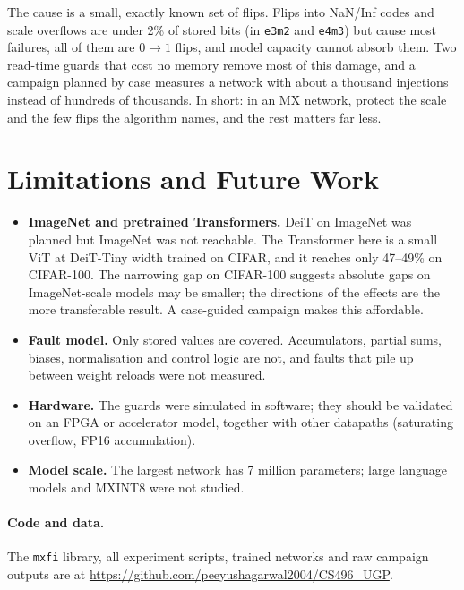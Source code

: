 \documentclass[12pt,a4paper]{article}
\newcommand{\fmt}[1]{\texttt{#1}}
\begin{document}
The cause is a small, exactly known set of flips. Flips into NaN/Inf codes and scale
overflows are under 2\% of stored bits (in \fmt{e3m2} and \fmt{e4m3}) but cause most failures, all of them are $0\to1$ flips, and
model capacity cannot absorb them. Two read-time guards that cost no memory remove most of
this damage, and a campaign planned by case measures a network with about a thousand
injections instead of hundreds of thousands. In short: in an MX network, protect the scale and
the few flips the algorithm names, and the rest matters far less.

\section{Limitations and Future Work}

\begin{itemize}
    \item \textbf{ImageNet and pretrained Transformers.} DeiT on ImageNet was planned but ImageNet
          was not reachable. The Transformer here is a small ViT at DeiT-Tiny width trained on
          CIFAR, and it reaches only 47--49\% on CIFAR-100. The narrowing gap on CIFAR-100
          suggests absolute gaps on ImageNet-scale models may be smaller; the directions of the
          effects are the more transferable result. A case-guided campaign makes this affordable.
    \item \textbf{Fault model.} Only stored values are covered. Accumulators, partial sums,
          biases, normalisation and control logic are not, and faults that pile up between
          weight reloads were not measured.
    \item \textbf{Hardware.} The guards were simulated in software; they should be validated on an
          FPGA or accelerator model, together with other datapaths (saturating overflow, FP16
          accumulation).
    \item \textbf{Model scale.} The largest network has 7 million parameters; large language models
          and MXINT8 were not studied.
\end{itemize}

\paragraph{Code and data.} The \texttt{mxfi} library, all experiment scripts, trained networks
and raw campaign outputs are at \url{https://github.com/peeyushagarwal2004/CS496_UGP}.
\end{document}

